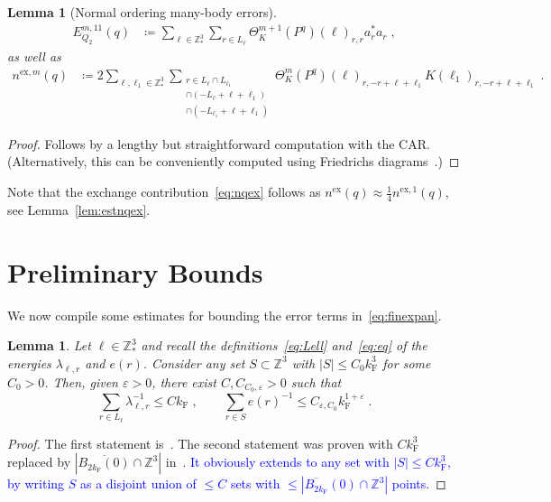 \documentclass[12pt,a4paper]{article}
\numberwithin{equation}{section}
\newcommand{\1}{\mathbb{I}}
\newcommand{\ex}{\mathrm{ex}}
\newcommand{\F}{\mathrm{F}}
\newcommand{\Z}{\mathbb{Z}}
\theoremstyle{plain}
\newtheorem{lemma}[theorem]{Lemma}
\theoremstyle{definition}
\theoremstyle{remark}
\theoremstyle{plain}
\theoremstyle{definition}
\theoremstyle{remark}
\begin{document}
\begin{lemma}[Normal ordering many-body errors]
\begin{align}
	E_{Q_2}^{m,11}(q)
	&\coloneq \sum_{\ell \in \Z^3_*} \sum_{r\in L_{\ell}}\Theta^{m+1}_{K}(P^q)(\ell)_{r,r} a^*_{r}a_{r} \;, \label{eq:expandedEQ2}
\end{align}
as well as
\begin{align}
	n^{\ex,m}(q)
	&\coloneq 2 \sum_{\ell,\ell_1 \in \Z^3_*}\sum_{\substack{r\in L_{\ell} \cap L_{\ell_1}\\ \cap (-L_{\ell}+\ell+\ell_1) \\ \cap (-L_{\ell_1}+\ell+\ell_1 )}} \!\!\!\Theta^m_{K}(P^q)(\ell)_{r,-r+\ell+\ell_1}K(\ell_1)_{r,-r+\ell+\ell_1} \;. \label{eq:nqexm}
\end{align}
\end{lemma}
\begin{proof}
Follows by a lengthy but straightforward computation with the CAR. (Alternatively, this can be conveniently computed using Friedrichs diagrams~\cite{BL23}.)
\end{proof}

Note that the exchange contribution~\eqref{eq:nqex} follows as $ n^{\ex}(q) \approx \frac 14 n^{\ex,1}(q) $, see Lemma~\ref{lem:estnqex}.




\section{Preliminary Bounds}
\label{sec:prelim_bounds}

We now compile some estimates for bounding the error terms in~\eqref{eq:finexpan}.

\begin{lemma} \label{lem:lambdainverse}
Let $ \ell \in \Z^3_* $ and recall the definitions~\eqref{eq:Lell} and~\eqref{eq:eq} of the energies $ \lambda_{\ell,r} $ and $ e(r) $. Consider any set $ S \subset \Z^3 $ with $ |S| \le C_0 k_{\F}^3 $ for some $ C_0 > 0 $. Then, given $ \varepsilon > 0 $, there exist $ C, C_{C_0, \varepsilon} > 0 $ such that
\begin{equation} \label{eq:lambdainverse}
	\sum_{r \in L_\ell} \lambda_{\ell,r}^{-1} \le C k_{\F} \;, \qquad
	\sum_{r \in S} e(r)^{-1} \le C_{\varepsilon, C_0} k_{\F}^{1+\varepsilon} \;.
\end{equation}
\end{lemma}
\begin{proof}
The first statement is~\cite[Prop.~A.2]{CHN21}. The second statement was proven with $ C k_{\F}^3 $ replaced by $ |\overline{B_{2 k_{\F}}(0)} \cap \Z^3| $ in~\cite[Lemma~3.2]{CHN24}. \textcolor{blue}{It obviously extends to any set with $ |S| \le C k_{\F}^3 $, by writing $ S $ as a disjoint union of $ \le C $ sets with $ \le |\overline{B_{2 k_{\F}}}(0) \cap \Z^3| $ points.}
\end{proof}
\end{document}
